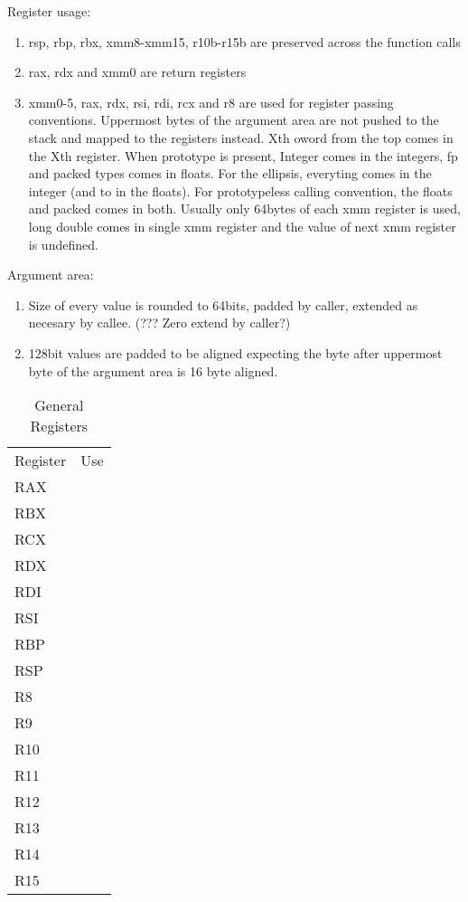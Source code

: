 Register usage:
\begin{enumerate}
\item rsp, rbp, rbx, xmm8-xmm15, r10b-r15b are preserved across
      the function calls
\item rax, rdx and xmm0 are return registers
\item xmm0-5, rax, rdx, rsi, rdi, rcx and r8 are used for register passing
    conventions.  Uppermost
    bytes of the argument area are not pushed to the stack and mapped to the
    registers instead. Xth oword from the top comes in the Xth register.
    When prototype is present, Integer comes in the integers, fp and
    packed types comes in floats.
    For the ellipsis, everyting comes in the integer (and to in the floats).
    For prototypeless calling convention, the floats and packed comes in
    both.
    Usually only 64bytes of each xmm register is used, long double comes in
    single xmm register and the value of next xmm register is undefined.
\end{enumerate}

 Argument area:
\begin{enumerate}
\item Size of every value is rounded to 64bits, padded by caller, extended as
    necesary by callee.
    (??? Zero extend by caller?)
\item 128bit values are padded to be aligned expecting the byte after
      uppermost byte of the argument area is 16 byte aligned.
\end{enumerate}

\begin{table}
\caption{General Registers}
\begin{center}
\begin{tabular}{ll}
\hline\noalign{\smallskip}
Register & Use \\
\noalign{\smallskip}\hline\noalign{\smallskip}
RAX & \\
RBX & \\
RCX & \\
RDX & \\
RDI & \\
RSI & \\
RBP & \\
RSP & \\
R8 & \\
R9 & \\
R10 & \\
R11 & \\
R12 & \\
R13 & \\
R14 & \\
R15 & \\
\hline
\end{tabular}
\end{center}
\end{table}

